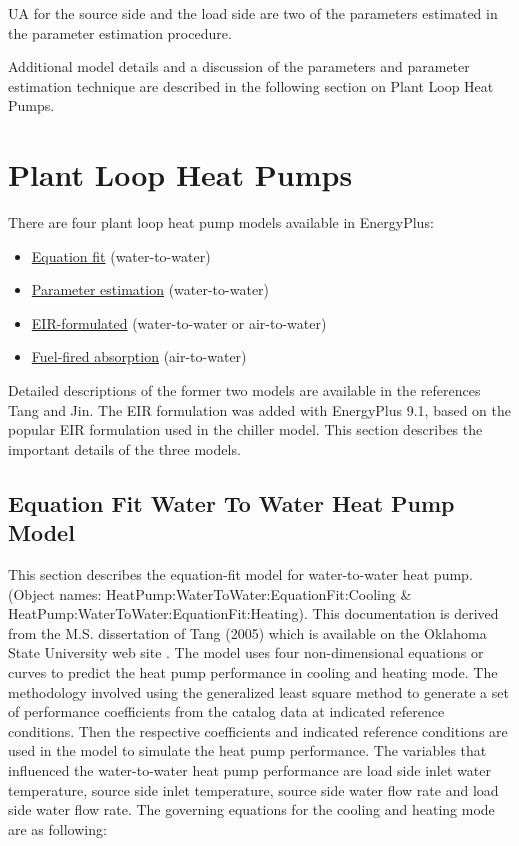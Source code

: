 UA for the source side and the load side are two of the parameters estimated in the parameter estimation procedure.

Additional model details and a discussion of the parameters and parameter estimation technique are described in the following section on Plant Loop Heat Pumps.

\section{Plant Loop Heat Pumps}\label{plant-loop-heat-pumps}

There are four plant loop heat pump models available in EnergyPlus:

\begin{itemize}
  \item \hyperref[equation-fit-water-to-water-heat-pump-model]{Equation fit} (water-to-water)
  \item \hyperref[parameter-estimation-water-to-water-heat-pump-model]{Parameter estimation} (water-to-water)
  \item \hyperref[eir-plant-loop-heat-pump-model]{EIR-formulated} (water-to-water or air-to-water)
  \item \hyperref[fuel-fired-air-to-water-heat-pumps]{Fuel-fired absorption} (air-to-water)
\end{itemize}

Detailed descriptions of the former two models are available in the references Tang and Jin.  The EIR formulation was added with EnergyPlus 9.1, based on the popular EIR formulation used in the chiller model.  This section describes the important details of the three models.

\subsection{Equation Fit Water To Water Heat Pump Model}\label{equation-fit-water-to-water-heat-pump-model}

This section describes the equation-fit model for water-to-water heat pump. (Object names: HeatPump:WaterToWater:EquationFit:Cooling \& HeatPump:WaterToWater:EquationFit:Heating). This documentation is derived from the M.S. dissertation of Tang (2005) which is available on the Oklahoma State University web site . The model uses four non-dimensional equations or curves to predict the heat pump performance in cooling and heating mode. The methodology involved using the generalized least square method to generate a set of performance coefficients from the catalog data at indicated reference conditions. Then the respective coefficients and indicated reference conditions are used in the model to simulate the heat pump performance. The variables that influenced the water-to-water heat pump performance are load side inlet water temperature, source side inlet temperature, source side water flow rate and load side water flow rate. The governing equations for the cooling and heating mode are as following:

